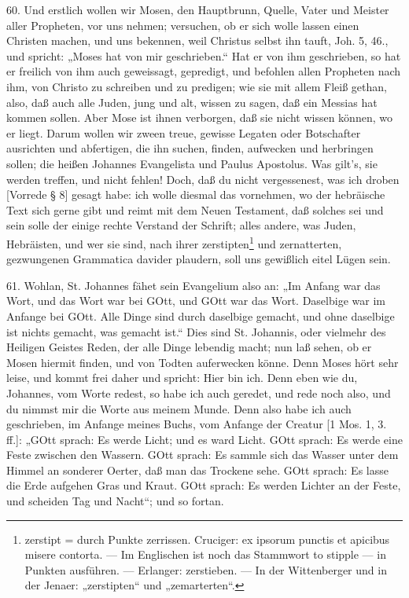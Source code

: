 60. Und erstlich wollen wir Mosen, den Hauptbrunn, Quelle, Vater und Meister aller Propheten, vor uns nehmen; versuchen, ob er sich wolle lassen einen Christen machen, und uns bekennen, weil Christus selbst ihn tauft, Joh. 5, 46., und spricht: „Moses hat von mir geschrieben.“ Hat er von ihm geschrieben, so hat er freilich von ihm auch geweissagt, gepredigt, und befohlen allen Propheten nach ihm, von Christo zu schreiben und zu predigen; wie sie mit allem Fleiß gethan, also, daß auch alle Juden, jung und alt, wissen zu sagen, daß ein Messias hat kommen sollen. Aber Mose ist ihnen verborgen, daß sie nicht wissen können, wo er liegt. Darum wollen wir zween treue, gewisse Legaten oder Botschafter
ausrichten und abfertigen, die ihn suchen, finden, aufwecken und herbringen sollen; die heißen Johannes Evangelista und Paulus Apostolus. Was gilt’s, sie werden treffen, und nicht fehlen! Doch, daß du nicht vergessenest, was ich droben [Vorrede § 8] gesagt habe: ich wolle diesmal das vornehmen, wo der hebräische Text sich gerne gibt und reimt mit dem Neuen Testament, daß solches sei und sein solle der einige rechte Verstand der Schrift; alles andere, was Juden, Hebräisten, und wer sie sind, nach ihrer zerstipten\footnote{zerstipt = durch Punkte zerrissen. Cruciger: ex ipsorum punctis et apicibus misere contorta. — Im Englischen ist noch das Stammwort to stipple — in Punkten ausführen. — Erlanger: zerstieben. — In der Wittenberger und in der Jenaer: „zerstipten“ und „zemarterten“.} und zernatterten, gezwungenen Grammatica davider plaudern, soll uns gewißlich eitel Lügen sein.

61. Wohlan, St. Johannes fähet sein Evangelium also an: „Im Anfang war das Wort, und das Wort war bei GOtt, und GOtt war das Wort. Daselbige war im Anfange bei GOtt. Alle Dinge sind durch daselbige gemacht, und ohne daselbige ist nichts gemacht, was gemacht ist.“ Dies sind St. Johannis, oder vielmehr des Heiligen Geistes Reden, der alle Dinge lebendig macht; nun laß sehen, ob er Mosen hiermit finden, und von Todten auferwecken könne. Denn Moses hört sehr leise, und kommt frei daher und spricht: Hier bin ich. Denn eben wie du, Johannes, vom Worte redest, so habe ich auch geredet, und rede noch also, und du nimmst mir die Worte aus meinem Munde. Denn also habe ich auch geschrieben, im Anfange meines Buchs, vom Anfange der Creatur [1 Mos. 1, 3. ff.]: „GOtt sprach: Es werde Licht; und es ward Licht. GOtt sprach: Es werde eine Feste zwischen den Wassern. GOtt sprach: Es sammle sich das Wasser unter dem Himmel an sonderer Oerter, daß man das Trockene sehe. GOtt sprach: Es lasse die Erde aufgehen Gras und Kraut. GOtt sprach: Es werden Lichter an der Feste, und scheiden Tag und Nacht“; und so fortan.

